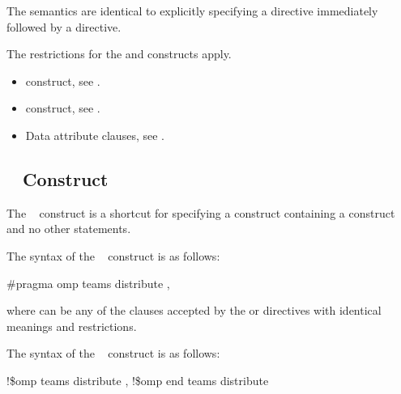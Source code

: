 {{{{The semantics are identical to explicitly specifying a  directive 
immediately followed by a  directive. 

\restrictions
The restrictions for the  and  constructs apply.

\crossreferences
\begin{itemize}
\item {} construct, see 
.

\item {} construct, see 
.

\item Data attribute clauses, see 
.
\end{itemize}









\subsection{~ Construct}
\label{subsec:teams distribute Construct}
\summary
The ~ construct is a shortcut for specifying a  construct 
containing a  construct and no other statements.

\syntax
\ccppspecificstart
The syntax of the ~ construct is as follows:

\begin{boxedcode}
\#pragma omp teams distribute \plc{[clause[ [},\plc{] clause] ... ] new-line}
\end{boxedcode}

where  can be any of the clauses accepted by the  or  
directives with identical meanings and restrictions.
\ccppspecificend

\fortranspecificstart
The syntax of the ~ construct is as follows:

\begin{boxedcode}
!\$omp teams distribute \plc{[clause[ [},\plc{] clause] ... ]}
\plc{[}!\$omp end teams distribute\plc{]}
\end{boxedcode}

}}}}

